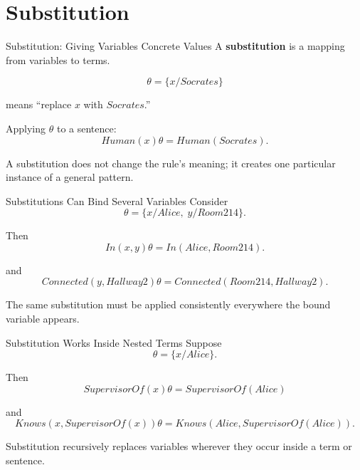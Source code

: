 \documentclass[aspectratio=169,10pt]{beamer}
\begin{document}
\section{Substitution}

\begin{frame}[shrink=10]{Substitution: Giving Variables Concrete Values}
  A \textbf{substitution} is a mapping from variables to terms.

  \[
    \theta = \{x/Socrates\}
  \]

  means ``replace $x$ with $Socrates$.''

  Applying $\theta$ to a sentence:
  \[
    Human(x)\theta = Human(Socrates).
  \]

  \begin{keyidea}
    A substitution does not change the rule's meaning; it creates one particular instance of a general pattern.
  \end{keyidea}
\end{frame}

\begin{frame}[shrink=10]{Substitutions Can Bind Several Variables}
  Consider
  \[
    \theta = \{x/Alice,\;y/Room214\}.
  \]

  Then
  \[
    In(x,y)\theta = In(Alice,Room214).
  \]

  and
  \[
    Connected(y,Hallway2)\theta = Connected(Room214,Hallway2).
  \]

  \begin{keyidea}
    The same substitution must be applied consistently everywhere the bound variable appears.
  \end{keyidea}
\end{frame}

\begin{frame}[shrink=10]{Substitution Works Inside Nested Terms}
  Suppose
  \[
    \theta = \{x/Alice\}.
  \]

  Then
  \[
    SupervisorOf(x)\theta = SupervisorOf(Alice)
  \]

  and
  \[
    Knows(x,SupervisorOf(x))\theta
    = Knows(Alice,SupervisorOf(Alice)).
  \]

  \begin{keyidea}
    Substitution recursively replaces variables wherever they occur inside a term or sentence.
  \end{keyidea}
\end{frame}
\end{document}

